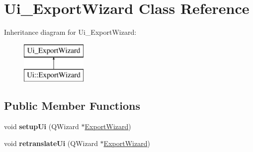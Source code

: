 \hypertarget{class_ui___export_wizard}{}\section{Ui\+\_\+\+Export\+Wizard Class Reference}
\label{class_ui___export_wizard}
Inheritance diagram for Ui\+\_\+\+Export\+Wizard\+:\begin{figure}[H]
\begin{center}
\leavevmode
\includegraphics[height=2.000000cm]{class_ui___export_wizard}
\end{center}
\end{figure}
\subsection*{Public Member Functions}
\begin{DoxyCompactItemize}
\item 
\hypertarget{class_ui___export_wizard_aeb617b4b1c2c57a797a17552f6a2a336}{}void {\bfseries setup\+Ui} (Q\+Wizard $\ast$\hyperlink{class_export_wizard}{Export\+Wizard})\label{class_ui___export_wizard_aeb617b4b1c2c57a797a17552f6a2a336}

\item 
\hypertarget{class_ui___export_wizard_ae48fdbd6514577abbaa201f9d47c324d}{}void {\bfseries retranslate\+Ui} (Q\+Wizard $\ast$\hyperlink{class_export_wizard}{Export\+Wizard})\label{class_ui___export_wizard_ae48fdbd6514577abbaa201f9d47c324d}

\end{DoxyCompactItemize}
